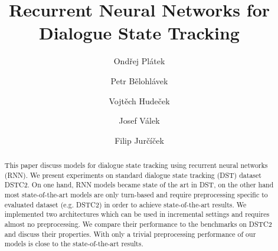 \documentclass{itatnew}
\def\OP#1{\textcolor{purple}{OP: \textit{#1}}}
\def\PB#1{\textcolor{red}{PB: \textit{#1}}}
\begin{document}
\title{Recurrent Neural Networks for Dialogue State Tracking}

\author{Ondřej Plátek \and Petr Bělohlávek \and Vojtěch Hudeček \and
Josef Válek \and Filip Jurčíček}


\maketitle              %




\begin{abstract}
This paper discuss models for dialogue state tracking using recurrent neural networks (RNN).
We present experiments on standard dialogue state tracking (DST) dataset DSTC2\cite{henderson2014second}.
On one hand, RNN models became state of the art in DST,
on the other hand most state-of-the-art models are only turn-based and require preprocessing specific to evaluated dataset (e.g. DSTC2) in order to achieve state-of-the-art results.
We implemented two architectures which can be used in incremental settings and requires almost no preprocessing.
We compare their performance to the benchmarks on DSTC2 and discuss their properties.
With only a trivial preprocessing performance of our models is close to the state-of-the-art results.
\end{abstract}
%
\end{document}
